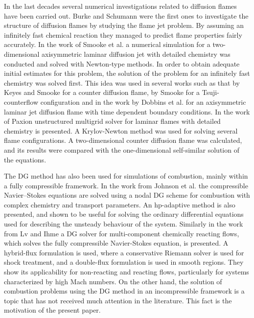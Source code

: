 In the last decades several numerical investigations related to diffusion flames have been carried out. Burke and Schumann were the first ones to investigate the structure of diffusion flames by studying the flame jet problem. \cite{burkeDiffusionFlames1928} By assuming an infinitely fast chemical reaction they managed to predict flame properties fairly accurately. In the work of Smooke et al. \cite{smookeNumericalSolutionTwoDimensional1986} a numerical simulation for a two-dimensional axisymmetric laminar diffusion jet  with detailed chemistry was conducted and solved with Newton-type methods. In order to obtain adequate initial estimates for this problem, the solution of the problem for an infinitely fast chemistry was solved first. This idea was used in several works such as that by Keyes and Smooke \cite{keyesFlameSheetStarting1987} for a counter diffusion flame, by Smooke \cite{smookeNumericalModelingAxisymmetric1992} for a Tsuji-counterflow configuration and in the work by Dobbins et al. \cite{dobbinsFullyImplicitCompact2010} for an axisymmetric laminar jet diffusion flame with time dependent boundary conditions. In the work of Paxion \cite{paxionDevelopmentParallelUnstructured2001} unstructured multigrid solver for laminar flames with detailed chemistry is presented. A Krylov-Newton method was used for solving several flame configurations. A two-dimensional counter diffusion flame was calculated, and its results were compared with the one-dimensional self-similar solution of the equations.

The DG method has also been used for simulations of combustion, mainly within a fully compressible framework. In the work from Johnson et al. \cite{johnsonConservativeDiscontinuousGalerkin2020} the compressible Navier--Stokes equations are solved using a nodal DG scheme for combustion with complex chemistry and transport parameters. An hp-adaptive method is also presented, and shown to be useful for solving the ordinary differential equations used for describing the unsteady behaviour of the system.  Similarly in the work from Lv and Ihme \cite{lvHighorderDiscontinuousGalerkin2017} a DG solver for multi-component chemically reacting flows, which solves the fully compressible Navier-Stokes equation, is presented. A hybrid-flux formulation is used, where a conservative Riemann solver is used for shock treatment, and a double-flux formulation is used in smooth regions. They show its applicability for non-reacting and reacting flows, particularly for systems characterized by high Mach numbers. On the other hand, the solution of combustion problems using the DG method in an incompressible framework is a topic that has not received much attention in the literature. This fact is the motivation of the present paper.

